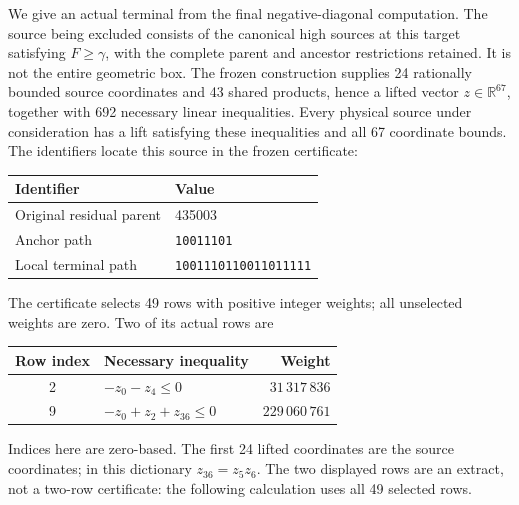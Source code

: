 \documentclass[11pt,reqno]{amsart}
\theoremstyle{definition}
\theoremstyle{remark}
\newcommand{\R}{\mathbb R}
\newcommand{\gam}{\gamma}
\begin{document}
We give an actual terminal from the final negative-diagonal computation.
The source being excluded consists of the
canonical high sources at this target satisfying \(F\ge\gam\), with
the complete parent and ancestor restrictions retained. It is not the
entire geometric box. The frozen construction supplies 24 rationally
bounded source coordinates and 43 shared products, hence a lifted vector
\(z\in\R^{67}\), together with 692 necessary linear inequalities.
Every physical source under consideration has a lift satisfying these
inequalities and all 67 coordinate bounds.
The identifiers locate this source in the frozen certificate:
\begin{center}
\begin{tabular}{@{}ll@{}}
\toprule
Identifier & Value\\
\midrule
Original residual parent & 435003\\
Anchor path & \texttt{10011101}\\
Local terminal path & \texttt{1001110110011011111}\\
\bottomrule
\end{tabular}
\end{center}

The certificate selects 49 rows with positive integer weights; all
unselected weights are zero. Two of its actual rows are
\begin{center}
\begin{tabular}{@{}cl r@{}}
\toprule
Row index & Necessary inequality & Weight \\
\midrule
2 & \(-z_0-z_4\le0\) & \(31\,317\,836\) \\
9 & \(-z_0+z_2+z_{36}\le0\) & \(229\,060\,761\) \\
\bottomrule
\end{tabular}
\end{center}
Indices here are zero-based. The first 24 lifted coordinates are the
source coordinates; in this dictionary \(z_{36}=z_5z_6\).
The two displayed rows are an extract, not a two-row certificate:
the following calculation uses all 49 selected rows.
\end{document}
